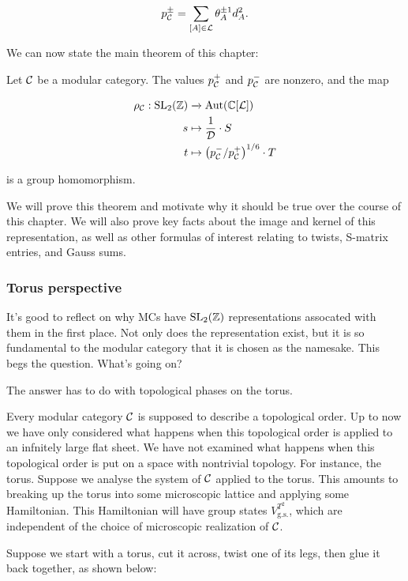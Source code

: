 $$p^{\pm}_{{\mathcal C}}=\sum_{[A]\in {\mathcal L}}\theta_A^{\pm 1}d_A^2.$$

We can now state the main theorem of this chapter:

\begin{thrm} Let ${\mathcal C}$ be a modular category. The values $p_{{\mathcal C}}^{+}$ and $p_{{\mathcal C}}^{-}$ are nonzero, and the map

\begin{align*}
\rho_{{\mathcal C}}:\operatorname{SL}_2({\mathbb Z})&\xrightarrow{}\operatorname{Aut}({\mathbb C}[{\mathcal L}])\\
s & \mapsto \frac{1}{{\mathcal D}}\cdot S\\ 
t & \mapsto \left(p_{{\mathcal C}}^{-}/p_{{\mathcal C}}^+\right)^{1/6}\cdot T
\end{align*}

is a group homomorphism.
\end{thrm}

We will prove this theorem and motivate why it should be true over the course of this chapter. We will also prove key facts about the image and kernel of this representation, as well as other formulas of interest relating to twists, S-matrix entries, and Gauss sums.

\subsubsection{Torus perspective}

It's good to reflect on why MCs have $\operatorname{SL}_2({\mathbb Z})$ representations assocated with them in the first place. Not only does the representation exist, but it is so fundamental to the modular category that it is chosen as the namesake. This begs the question. What's going on?

The answer has to do with topological phases on the torus.


Every modular category ${\mathcal C}$ is supposed to describe a topological order. Up to now we have only considered what happens when this topological order is applied to an infnitely large flat sheet. We have not examined what happens when this topological order is put on a space with nontrivial topology. For instance, the torus. Suppose we analyse the system of ${\mathcal C}$ applied to the torus. This amounts to breaking up the torus into some microscopic lattice and applying some Hamiltonian. This Hamiltonian will have group states $V_{\text{g.s.}}^{T^2}$, which are independent of the choice of microscopic realization of ${\mathcal C}$.

Suppose we start with a torus, cut it across, twist one of its legs, then glue it back together, as shown below:

